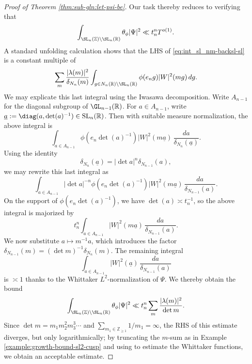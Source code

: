 \begin{proof}[Proof of Theorem \ref{thm:sub-gln:let-psi-be}]
  Our task thereby reduces to verifying that
  \begin{equation}\label{eq:int_sl_nm-backsl-sl}
    \int_{\SL_n(\mathbb{Z}) \backslash \SL_n(\mathbb{R})} \theta_\phi |\Psi|^2 \ll t_n^n T^{o(1)}.
  \end{equation}
  A standard unfolding calculation shows that the LHS of \eqref{eq:int_sl_nm-backsl-sl} is a constant multiple of
  \begin{equation}\label{eq:sum-_m-fracl}
    \sum_{m}
    \frac{|\lambda(m)|^2}{\delta_{N_n}(m)}
    \int_{g \in N_n(\mathbb{R}) \backslash \SL_n(\mathbb{R})} \phi(e_n g)
    |W|^2(m  g) \, d g.
  \end{equation}
  We may explicate this last integral using the Iwasawa decomposition.  Write $A_{n-1}$ for the diagonal subgroup of $\GL_{n-1}(\mathbb{R})$.  For $a \in A_{n - 1}$, write $\underline{a} := \diag(a, \det(a)^{-1}) \in \mathrm{SL}_n(\mathbb{R})$.  Then with suitable measure normalization, the above integral is
  \begin{equation*}
    \int_{a \in A_{n-1}}
    \phi(e_n \det(a)^{-1})
    |W|^2(m \underline{a}) \, \frac{d a }{ \delta_{N_n}(\underline{a})}.
  \end{equation*}
  Using the identity
  \begin{equation*}
    \delta_{N_n}(\underline{a}) = |\det a|^{n} \delta_{N_{n-1}}(a),
  \end{equation*}
  we may rewrite this last integral as
  \begin{equation*}
    \int_{a \in A_{n-1}}
    |\det a|^{-n}
    \phi(e_n \det(a)^{-1})
    |W|^2(m \underline{a}) \, \frac{d a }{ \delta_{N_{n-1}}(a)}.
  \end{equation*}
  On the support of $\phi (e_n \det(a)^{-1})$, we have $\det(a) \asymp t_n^{-1}$, so the above integral is majorized by
  \begin{equation*}
    t_n^{n} \int_{a \in A_{n-1}} |W|^2(m \underline{a}) \, \frac{d a }{ \delta_{N_{n-1}}(a) }.
  \end{equation*}
  We now substitute $a \mapsto m^{-1} a$, which introduces the factor $\delta_{N_{n-1}}(m) = (\det m)^{-1} \delta_{N_{n}}(m)$.  The remaining integral
  \begin{equation*}
    \int_{a \in A_{n-1}} |W|^2(\underline{a}) \, \frac{d a}{\delta_{N_{n-1}}(a)}
  \end{equation*}
  is $\asymp 1$ thanks to the Whittaker $L^2$-normalization of $\Psi$.  We thereby obtain the bound
  \begin{equation*}
    \int  _{\SL_n(\mathbb{Z}) \backslash \SL_n(\mathbb{R})}
    \theta_\phi |\Psi|^2
    \ll
    t_n^{n}
    \sum_{m}
    \frac{|\lambda(m)|^2}{ \det m }.
  \end{equation*}
  Since $\det m = m_1 m_2^2 m_3^3 \dotsb$ and $\sum_{m_1 \in \mathbb{Z}_{\geq 1}} 1/m_1 = \infty$, the RHS of this estimate diverges, but only logarithmically; by truncating the $m$-sum as in Example \ref{example:growth-bound-sl2-cusp} and using \cite[Thm 2]{MR4093914} to estimate the Whittaker functions, we obtain an acceptable estimate.
\end{proof}

